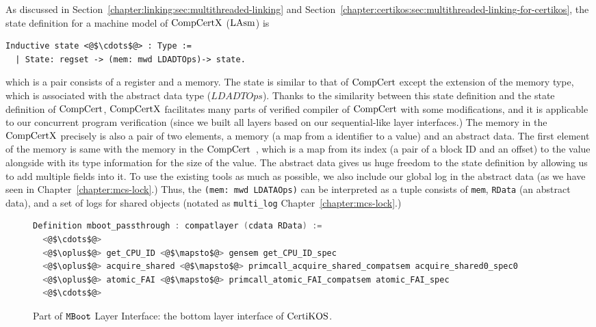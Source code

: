 As discussed in Section~\ref{chapter:linking:sec:multithreaded-linking} and Section~\ref{chapter:certikos:sec:multithreaded-linking-for-certikos},
the state definition for a machine model of  $\mathrm{CompCertX}$ ($\mathrm{LAsm}$) is
\begin{lstlisting}
Inductive state <@$\cdots$@> : Type :=
  | State: regset -> (mem: mwd LDADTOps)-> state.
\end{lstlisting}
which is a pair consists of  a register and a memory. 
The state is similar to that of $\mathrm{CompCert}$ except the extension of the memory type, which is associated with 
the abstract data type ($LDADTOps$).
Thanks to the similarity between this state definition and the state definition of $\mathrm{CompCert}$, 
$\mathrm{CompCertX}$ facilitates many parts of verified compiler of $\mathrm{CompCert}$ with some modifications, 
and it is applicable to our concurrent program verification (since 
we built all layers based on our sequential-like layer interfaces.)
The memory in the $\mathrm{CompCertX}$ precisely  is also a pair of two elements, 
a memory (a map from a identifier to a value) and an abstract data. 
The first element of the memory is same with the memory in the $\mathrm{CompCert}$~\cite{leroy08},
 which is a map from its index (a pair of a block ID and an offset) to the value alongside with its type information for the size of the value. 
The abstract data gives us huge freedom to the state definition by allowing us to add multiple fields into it. 
To use the existing tools as much as possible, 
we also include our global log in the abstract data (as we have seen in Chapter~\ref{chapter:mcs-lock}.)
Thus, the \lstinline$(mem: mwd LDATAOps)$ can be interpreted as a tuple consists of 
\lstinline$mem$, \lstinline$RData$ (an abstract data), and a set of logs for shared objects (notated as \lstinline$multi_log$ 
Chapter~\ref{chapter:mcs-lock}.)


\begin{figure}
\begin{lstlisting}[language=C]
Definition mboot_passthrough : compatlayer (cdata RData) :=
  <@$\cdots$@>
  <@$\oplus$@> get_CPU_ID <@$\mapsto$@> gensem get_CPU_ID_spec
  <@$\oplus$@> acquire_shared <@$\mapsto$@> primcall_acquire_shared_compatsem acquire_shared0_spec0
  <@$\oplus$@> atomic_FAI <@$\mapsto$@> primcall_atomic_FAI_compatsem atomic_FAI_spec
  <@$\cdots$@>
\end{lstlisting}
\caption{Part of ${\mathrm{\texttt{MBoot}}}$ Layer Interface: the bottom layer interface of $\mathrm{CertiKOS}$.}
\label{fig:chapter:certikos:bottom-layer-interface}
\end{figure}

